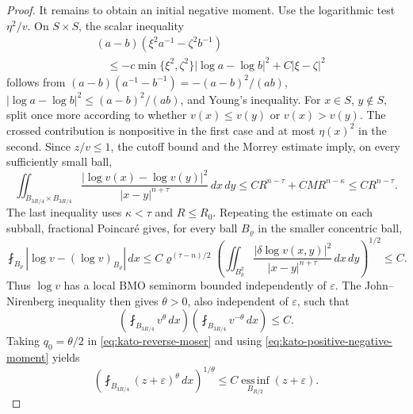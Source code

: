 \documentclass[11pt,reqno]{amsart}
\numberwithin{equation}{section}
\newcommand{\dd}{\,d}
\theoremstyle{remark}
\begin{document}
\begin{proof}
It remains to obtain an initial negative moment.  Use the logarithmic
test \(\eta^2/v\).  On \(S\times S\), the scalar inequality
\begin{align*}
 &(a-b)(\xi^2a^{-1}-\zeta^2b^{-1})\\
 &\quad\le-c\min\{\xi^2,\zeta^2\}
       |\log a-\log b|^2+C|\xi-\zeta|^2
\end{align*}
follows from
\((a-b)(a^{-1}-b^{-1})=-(a-b)^2/(ab)\),
\(|\log a-\log b|^2\le(a-b)^2/(ab)\), and Young's inequality.
For \(x\in S\), \(y\notin S\), split once more according to whether
\(v(x)\le v(y)\) or \(v(x)>v(y)\).  The crossed contribution is
nonpositive in the first case and at most \(\eta(x)^2\) in the second.
Since \(z/v\le1\), the cutoff bound and the Morrey estimate imply, on
every sufficiently small ball,
\begin{equation}
 \iint_{B_{3R/4}\times B_{3R/4}}
 \frac{|\log v(x)-\log v(y)|^2}{|x-y|^{n+\tau}}
 \dd x\!\dd y
 \le C R^{n-\tau}+CMR^{n-\kappa}
 \le C R^{n-\tau}.
 \label{eq:kato-logarithmic-energy}
\end{equation}
The last inequality uses \(\kappa<\tau\) and \(R\le R_0\).
Repeating the estimate on each subball, fractional Poincar\'e gives,
for every ball \(B_\varrho\) in the smaller concentric ball,
\[
 \fint_{B_\varrho}
 \left|\log v-(\log v)_{B_\varrho}\right|\dd x
 \le C\varrho^{(\tau-n)/2}
 \left(
 \iint_{B_\varrho^2}
 \frac{|\delta\log v(x,y)|^2}{|x-y|^{n+\tau}}\dd x\!\dd y
 \right)^{1/2}
 \le C.
\]
Thus \(\log v\) has a local BMO seminorm bounded independently of
\(\varepsilon\).  The John--Nirenberg inequality then
gives \(\theta>0\), also independent of \(\varepsilon\), such that
\begin{equation}
 \left(\fint_{B_{3R/4}}v^\theta\dd x\right)
 \left(\fint_{B_{3R/4}}v^{-\theta}\dd x\right)\le C.
 \label{eq:kato-positive-negative-moment}
\end{equation}
Taking \(q_0=\theta/2\) in \eqref{eq:kato-reverse-moser} and using
\eqref{eq:kato-positive-negative-moment} yields
\begin{equation}
 \left(\fint_{B_{3R/4}}(z+\varepsilon)^\theta\dd x\right)^{1/\theta}
 \le C\operatorname*{ess\,inf}_{B_{R/2}}(z+\varepsilon).
 \label{eq:kato-weak-harnack}
\end{equation}


\end{proof}
\end{document}
